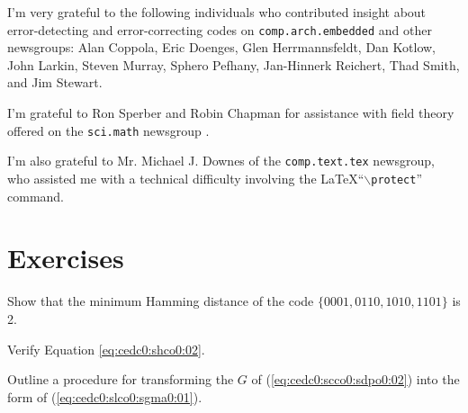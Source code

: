 I'm very grateful to the following individuals who contributed insight
about error-detecting and error-correcting
codes on \texttt{comp.arch.embedded}
and other
newsgroups:
Alan Coppola,
Eric Doenges,
Glen Herrmannsfeldt,
Dan Kotlow,
John Larkin,
Steven Murray,
Sphero Pefhany,
Jan-Hinnerk Reichert,
Thad Smith,
and
Jim Stewart.

I'm grateful to 
   Ron Sperber   \cite{bibref:i:ronsperber} and
 Robin Chapman \cite{bibref:i:robinchapman}
for assistance with field theory offered on the 
\texttt{sci.math} newsgroup \cite{bibref:n:scimathnewsgroup}.

I'm also grateful to Mr. Michael J. Downes of the 
\texttt{comp.text.tex} 
newsgroup, who assisted me with a technical difficulty involving
the \LaTeX ``$\backslash$\texttt{protect}'' command.


\section{Exercises}
\label{cedc0:sexe0}

\begin{vworkexercisestatement}
\label{exe:cedc0:sexe0:01}
Show that the minimum Hamming distance of the code $\{0001, 0110, 1010, 1101\}$
is 2.
\end{vworkexercisestatement}

\begin{vworkexercisestatement}
\label{exe:cedc0:sexe0:02}
Verify Equation \ref{eq:cedc0:shco0:02}.
\end{vworkexercisestatement}

\begin{vworkexercisestatement}
\label{exe:cedc0:sexe0:03}
Outline a procedure for transforming the $G$ of 
(\ref{eq:cedc0:scco0:sdpo0:02}) into 
the form of (\ref{eq:cedc0:slco0:sgma0:01}).
\end{vworkexercisestatement}
\vworkexercisefooter{}

\vworkexercisefooter{}




